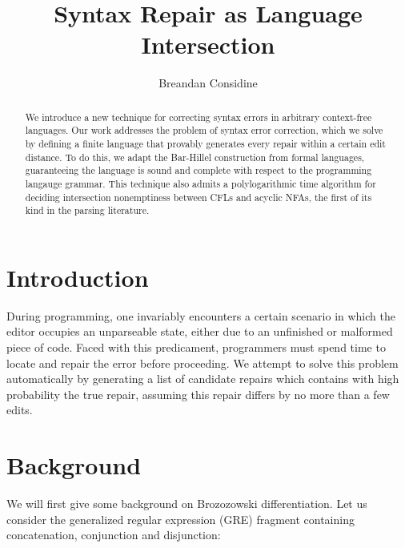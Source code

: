 \documentclass[sigplan,review,acmsmall,nonacm,screen,anonymous]{acmart}\settopmatter{printfolios=false,printccs=false,printacmref=false}
\begin{document}
%
\title{Syntax Repair as Language Intersection}
%
\begin{abstract}
  We introduce a new technique for correcting syntax errors in arbitrary context-free languages. Our work addresses the problem of syntax error correction, which we solve by defining a finite language that provably generates every repair within a certain edit distance. To do this, we adapt the Bar-Hillel construction from formal languages, guaranteeing the language is sound and complete with respect to the programming langauge grammar. This technique also admits a polylogarithmic time algorithm for deciding intersection nonemptiness between CFLs and acyclic NFAs, the first of its kind in the parsing literature.
\end{abstract}

  \author{Breandan Considine}

  \maketitle

  \section{Introduction}

  During programming, one invariably encounters a certain scenario in which the editor occupies an unparseable state, either due to an unfinished or malformed piece of code. Faced with this predicament, programmers must spend time to locate and repair the error before proceeding. We attempt to solve this problem automatically by generating a list of candidate repairs which contains with high probability the true repair, assuming this repair differs by no more than a few edits.

  \section{Background}

  We will first give some background on Brozozowski differentiation. Let us consider the generalized regular expression (GRE) fragment containing concatenation, conjunction and disjunction:
\end{document}
